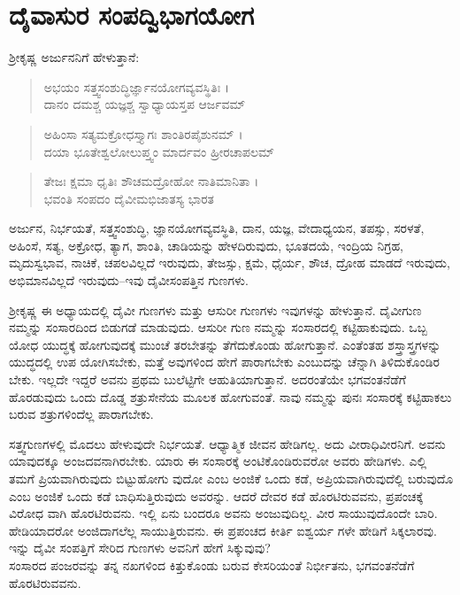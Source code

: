 
\chapter{ದೈವಾಸುರ ಸಂಪದ್ವಿಭಾಗಯೋಗ}

ಶ್ರೀಕೃಷ್ಣ ಅರ್ಜುನನಿಗೆ ಹೇಳುತ್ತಾನೆ:

\begin{verse}
ಅಭಯಂ ಸತ್ತ್ವಸಂಶುದ್ಧಿರ್ಜ್ಞಾನಯೋಗವ್ಯವಸ್ಥಿತಿಃ ।\\ದಾನಂ ದಮಶ್ಚ ಯಜ್ಞಶ್ಚ ಸ್ವಾಧ್ಯಾಯಸ್ತಪ ಆರ್ಜವಮ್ 
\end{verse}

\begin{verse}
ಅಹಿಂಸಾ ಸತ್ಯಮಕ್ರೋಧಸ್ತ್ಯಾಗಃ ಶಾಂತಿರಪೈಶುನಮ್ ।\\ದಯಾ ಭೂತೇಶ್ವಲೋಲುಪ್ತ್ವಂ ಮಾರ್ದವಂ ಹ್ರೀರಚಾಪಲಮ್ 
\end{verse}

\begin{verse}
ತೇಜಃ ಕ್ಷಮಾ ಧೃತಿಃ ಶೌಚಮದ್ರೋಹೋ ನಾತಿಮಾನಿತಾ ।\\ಭವಂತಿ ಸಂಪದಂ ದೈವೀಮಭಿಜಾತಸ್ಯ ಭಾರತ 
\end{verse}

{\small ಅರ್ಜುನ, ನಿರ್ಭಯತೆ, ಸತ್ತ್ವಸಂಶುದ್ಧಿ, ಜ್ಞಾನಯೋಗವ್ಯವಸ್ಥಿತಿ, ದಾನ, ಯಜ್ಞ, ವೇದಾಧ್ಯಯನ, ತಪಸ್ಸು, ಸರಳತೆ, ಅಹಿಂಸೆ, ಸತ್ಯ, ಅಕ್ರೋಧ, ತ್ಯಾಗ, ಶಾಂತಿ, ಚಾಡಿಯನ್ನು ಹೇಳದಿರುವುದು, ಭೂತದಯೆ, ಇಂದ್ರಿಯ ನಿಗ್ರಹ, ಮೃದುಸ್ವಭಾವ, ನಾಚಿಕೆ, ಚಪಲವಿಲ್ಲದೆ ಇರುವುದು, ತೇಜಸ್ಸು, ಕ್ಷಮೆ, ಧೈರ್ಯ, ಶೌಚ, ದ್ರೋಹ ಮಾಡದೆ ಇರುವುದು, ಅಭಿಮಾನವಿಲ್ಲದೆ ಇರುವುದು–ಇವು ದೈವೀಸಂಪತ್ತಿನ ಗುಣಗಳು.}

ಶ್ರೀಕೃಷ್ಣ ಈ ಅಧ್ಯಾಯದಲ್ಲಿ ದೈವೀ ಗುಣಗಳು ಮತ್ತು ಆಸುರೀ ಗುಣಗಳು ಇವುಗಳನ್ನು ಹೇಳುತ್ತಾನೆ. ದೈವೀಗುಣ ನಮ್ಮನ್ನು ಸಂಸಾರದಿಂದ ಬಿಡುಗಡೆ ಮಾಡುವುದು. ಆಸುರೀ ಗುಣ ನಮ್ಮನ್ನು ಸಂಸಾರದಲ್ಲಿ ಕಟ್ಟಿಹಾಕುವುದು. ಒಬ್ಬ ಯೋಧ ಯುದ್ಧಕ್ಕೆ ಹೋಗುವುದಕ್ಕೆ ಮುಂಚೆ ತರಬೇತನ್ನು ತೆಗೆದುಕೊಂಡು ಹೋಗುತ್ತಾನೆ. ಎಂತೆಂತಹ ಶಸ್ತ್ರಾಸ್ತ್ರಗಳನ್ನು ಯುದ್ಧದಲ್ಲಿ ಉಪ ಯೋಗಿಸಬೇಕು, ಮತ್ತೆ ಅವುಗಳಿಂದ ಹೇಗೆ ಪಾರಾಗಬೇಕು ಎಂಬುದನ್ನು ಚೆನ್ನಾಗಿ ತಿಳಿದುಕೊಂಡಿರ ಬೇಕು. ಇಲ್ಲದೇ ಇದ್ದರೆ ಅವನು ಪ್ರಥಮ ಬುಲೆಟ್ಟಿಗೇ ಆಹುತಿಯಾಗುತ್ತಾನೆ. ಅದರಂತೆಯೇ ಭಗವಂತನೆಡೆಗೆ ಹೊರಡುವುದು ಒಂದು ದೊಡ್ಡ ಶತ್ರುಸೇನೆಯ ಮೂಲಕ ಹೋಗುವಂತೆ. ನಾವು ನಮ್ಮನ್ನು ಪುನಃ ಸಂಸಾರಕ್ಕೆ ಕಟ್ಟಿಹಾಕಲು ಬರುವ ಶತ್ರುಗಳಿಂದೆಲ್ಲ ಪಾರಾಗಬೇಕು.

ಸತ್ತ್ವಗುಣಗಳಲ್ಲಿ ಮೊದಲು ಹೇಳುವುದೇ ನಿರ್ಭಯತೆ. ಆಧ್ಯಾತ್ಮಿಕ ಜೀವನ ಹೇಡಿಗಲ್ಲ. ಅದು ವೀರಾಧಿವೀರನಿಗೆ. ಅವನು ಯಾವುದಕ್ಕೂ ಅಂಜದವನಾಗಿರಬೇಕು. ಯಾರು ಈ ಸಂಸಾರಕ್ಕೆ ಅಂಟಿಕೊಂಡಿರುವರೋ ಅವರು ಹೇಡಿಗಳು. ಎಲ್ಲಿ ತಮಗೆ ಪ್ರಿಯವಾಗಿರುವುದು ಬಿಟ್ಟುಹೋಗು ವುದೋ ಎಂಬ ಅಂಜಿಕೆ ಒಂದು ಕಡೆ, ಅಪ್ರಿಯವಾಗಿರುವುದೆಲ್ಲಿ ಬರುವುದೊ ಎಂಬ ಅಂಜಿಕೆ ಒಂದು ಕಡೆ ಬಾಧಿಸುತ್ತಿರುವುದು ಅವರನ್ನು. ಆದರೆ ದೇವರ ಕಡೆ ಹೊರಟಿರುವವನು, ಪ್ರಪಂಚಕ್ಕೆ ವಿರೋಧ ವಾಗಿ ಹೊರಟಿರುವನು. ಇಲ್ಲಿ ಏನು ಬಂದರೂ ಅವನು ಅಂಜುವುದಿಲ್ಲ. ವೀರ ಸಾಯುವುದೊಂದೇ ಬಾರಿ. ಹೇಡಿಯಾದರೋ ಅಂಜಿದಾಗಲೆಲ್ಲ ಸಾಯುತ್ತಿರುವನು. ಈ ಪ್ರಪಂಚದ ಕೀರ್ತಿ ಐಶ್ವರ್ಯ ಗಳೇ ಹೇಡಿಗೆ ಸಿಕ್ಕಲಾರವು. ಇನ್ನು ದೈವೀ ಸಂಪತ್ತಿಗೆ ಸೇರಿದ ಗುಣಗಳು ಅವನಿಗೆ ಹೇಗೆ ಸಿಕ್ಕುವುವು?\\ಸಂಸಾರದ ಪಂಜರವನ್ನು ತನ್ನ ನಖಗಳಿಂದ ಕಿತ್ತುಕೊಂಡು ಬರುವ ಕೇಸರಿಯಂತೆ ನಿರ್ಭೀತನು, ಭಗವಂತನೆಡೆಗೆ ಹೊರಟಿರುವವನು.

